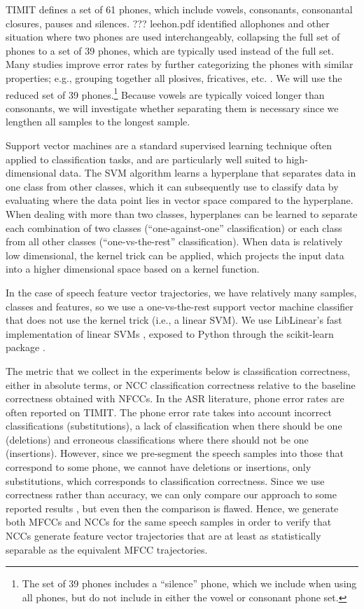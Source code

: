 TIMIT defines a set of 61 phones,
which include vowels, consonants,
consonantal closures, pauses and silences.
??? leehon.pdf identified
allophones and
other situation where two phones
are used interchangeably,
collapsing the full set of phones
to a set of 39 phones,
which are typically used
instead of the full set.
Many studies improve error rates
by further categorizing
the phones with similar properties;
e.g., grouping together all
plosives, fricatives, etc.
\cite{lopes2011}.
We will use the reduced set of 39 phones.\footnote{
  The set of 39 phones includes a ``silence'' phone,
  which we include when using all phones,
  but do not include in either the vowel or consonant
  phone set.}
Because vowels are typically voiced
longer than consonants,
we will investigate whether
separating them is necessary
since we lengthen all samples
to the longest sample.

Support vector machines are a standard
supervised learning technique
often applied to classification tasks,
and are particularly well suited
to high-dimensional data.
The SVM algorithm learns a hyperplane
that separates data
in one class from other classes,
which it can subsequently use
to classify data
by evaluating where the data point
lies in vector space compared to the hyperplane.
When dealing with more than two classes,
hyperplanes can be learned to separate
each combination of two classes
(``one-against-one'' classification)
or each class from all other classes
(``one-vs-the-rest'' classification).
When data is relatively low dimensional,
the kernel trick can be applied,
which projects the input data
into a higher dimensional space
based on a kernel function.

In the case of speech feature vector trajectories,
we have relatively many samples,
classes and features,
so we use a one-vs-the-rest
support vector machine classifier
that does not use the kernel trick
(i.e., a linear SVM).
We use LibLinear's fast implementation
of linear SVMs \cite{fan2008},
exposed to Python through
the scikit-learn package
\cite{pedregosa2011}.

The metric that we collect
in the experiments below
is classification correctness,
either in absolute terms,
or NCC classification correctness
relative to the baseline correctness
obtained with NFCCs.
In the ASR literature,
phone error rates are often
reported on TIMIT.
The phone error rate
takes into account
incorrect classifications
(substitutions),
a lack of classification
when there should be one
(deletions)
and erroneous classifications
where there should not be one
(insertions).
However, since we pre-segment
the speech samples into
those that correspond to some phone,
we cannot have deletions or insertions,
only substitutions,
which corresponds to classification correctness.
Since we use correctness
rather than accuracy,
we can only compare our approach
to some reported results
\cite{lopes2011},
but even then the comparison is flawed.
Hence, we generate both MFCCs
and NCCs for the same speech samples
in order to verify that
NCCs generate feature vector trajectories
that are at least as statistically separable
as the equivalent MFCC trajectories.

